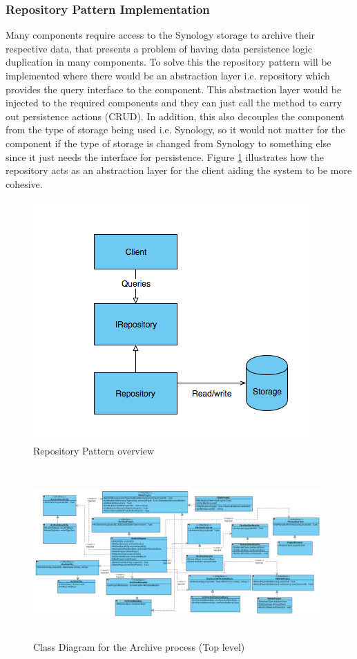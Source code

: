 \subsubsection{Repository Pattern Implementation}
Many components require access to the Synology storage to archive their respective data, that presents a problem of having data
persistence logic duplication in many components. To solve this the repository pattern will be implemented where there would be an abstraction layer i.e. repository which
provides the query interface to the component. This abstraction layer would be injected to the required components and they can just call the 
method to carry out persistence actions (CRUD). In addition, this also decouples the component from the type of storage being used i.e. Synology, so it would not
matter for the component if the type of storage is changed from Synology to something else since it just needs the interface for persistence. Figure 
\ref{fig:repositoryPattern} illustrates how the repository acts as an abstraction layer for the client aiding the system to be more cohesive. 
\begin{figure}[H]
    \centering \includegraphics[scale=0.7]{grafiken/repositoryPattern.png}
    \caption{Repository Pattern overview}
    \label{fig:repositoryPattern}
\end{figure}


\begin{figure}[H]
    \centering \includegraphics[height=6.5cm, angle=90, origin=c, width=11cm]{grafiken/archiveClass.png}
    \caption{Class Diagram for the Archive process (Top level)}
    \label{fig:archiveClassDiagram}
\end{figure}
